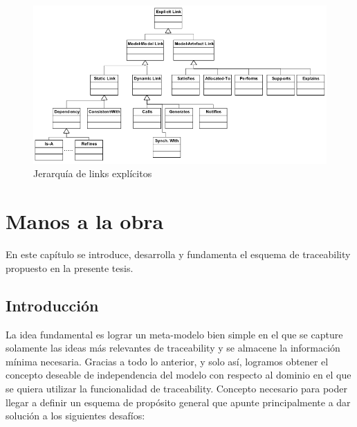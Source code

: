 \documentclass[a4paper,12pt,oneside,spanish]{book}
\begin{document}
\begin{figure}[hbtp]
\centering
\includegraphics[scale=0.51]{./img/ExplicitTraceLinks}
\caption{Jerarquía de links explícitos}
\label{fig:LinksExplicitos}
\end{figure}



\chapter{Manos a la obra}
\label{cap:Propuesta}

En este capítulo se introduce, desarrolla y fundamenta el esquema de traceability propuesto en la presente tesis.

\section{Introducción}
\label{sec:EsquemaPropIntro}

La idea fundamental es lograr un meta-modelo bien simple en el que se capture solamente las ideas más relevantes de traceability y se almacene la información mínima necesaria. Gracias a todo lo anterior, y solo así, logramos obtener el concepto deseable de independencia del modelo con respecto al dominio en el que se quiera utilizar la funcionalidad de traceability. Concepto necesario para poder llegar a definir un esquema de propósito general que apunte principalmente a dar solución a los siguientes desafíos:
\end{document}

